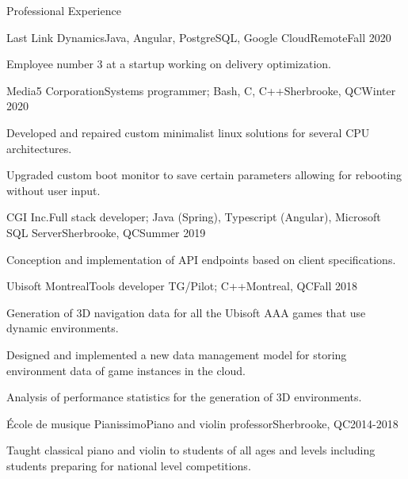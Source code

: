 \documentclass{article}
\newlength{\tabin}
\newlength{\secsep}
\newcommand{\lineunder}{\vspace*{-8pt} \\ \hspace*{-6pt} \hrulefill \\ \vspace*{-15pt}}
\newenvironment{tabbedsection}[1]{
  \begin{list}{}{
      \setlength{\itemsep}{0pt}
      \setlength{\labelsep}{0pt}
      \setlength{\labelwidth}{0pt}
      \setlength{\leftmargin}{\tabin}
      \setlength{\rightmargin}{\tabin}
      \setlength{\listparindent}{0pt}
      \setlength{\parsep}{0pt}
      \setlength{\parskip}{0pt}
      \setlength{\partopsep}{0pt}
      \setlength{\topsep}{#1}
    }
  \item[]
}{\end{list}}
\newenvironment{resume_section}[1]{
  \filbreak
  \vspace{2\secsep}
  \textsc{\large#1}
  \lineunder
  \begin{tabbedsection}{\secsep}
}{\end{tabbedsection}}
\newenvironment{subitems}{
  \renewcommand{\labelitemi}{-}
  \begin{itemize}
      \setlength{\labelsep}{1em}
}{\end{itemize}}
\newenvironment{resume_employer}[4]{
  \vspace{\secsep}
  \textbf{#1} \\ 
  \indent {\small #2} \hfill {\footnotesize#3 (#4)}
  \begin{tabbedsection}{0pt}
  \begin{subitems}
}{\end{subitems}\end{tabbedsection}}
\begin{document}
\begin{resume_section}{Professional Experience}
  \begin{resume_employer}{Last Link Dynamics}{Java, Angular, PostgreSQL, Google Cloud}{Remote}{Fall 2020}
    \item Employee number 3 at a startup working on delivery optimization.
  \end{resume_employer}
  \begin{resume_employer}{Media5 Corporation}{Systems programmer; Bash, C, C++}{Sherbrooke, QC}{Winter 2020}
    \item Developed and repaired custom minimalist linux solutions for several CPU architectures.
    \item Upgraded custom boot monitor to save certain parameters allowing for rebooting without user input.
  \end{resume_employer}
  \begin{resume_employer}{CGI Inc.}{Full stack developer; Java (Spring), Typescript (Angular), Microsoft SQL Server}{Sherbrooke, QC}{Summer 2019}
    \item Conception and implementation of API endpoints based on client specifications.
  \end{resume_employer}
  
    \begin{resume_employer}{Ubisoft Montreal}{Tools developer TG/Pilot; C++}{Montreal, QC}{Fall 2018} 
    \item Generation of 3D navigation data for all the Ubisoft AAA games that use dynamic environments.
    \item Designed and implemented a new data management model for storing environment data of game instances in the cloud.
    \item Analysis of performance statistics for the generation of 3D environments.
  \end{resume_employer}
  
  \begin{resume_employer}{École de musique Pianissimo}{Piano and violin professor}{Sherbrooke, QC}{2014-2018}
    \item Taught classical piano and violin to students of all ages and levels including students preparing for national level competitions.
  \end{resume_employer}
\end{resume_section}
\end{document}
